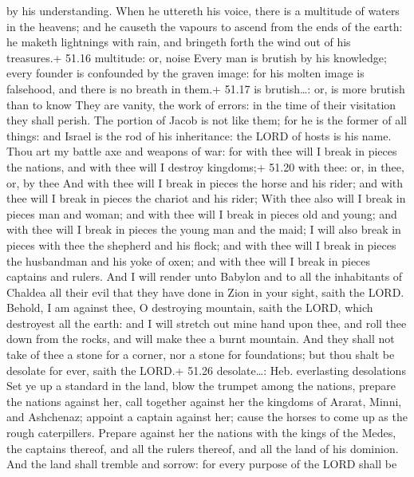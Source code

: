 by his understanding.  When he uttereth his voice, there is
a multitude of waters in the heavens; and he causeth the vapours to
ascend from the ends of the earth: he maketh lightnings with rain, and
bringeth forth the wind out of his treasures.+ 51.16 multitude: or,
noise  Every man is brutish by his knowledge; every founder
is confounded by the graven image: for his molten image is falsehood,
and there is no breath in them.+ 51.17 is brutish\ldots: or, is more
brutish than to know  They are vanity, the work of errors:
in the time of their visitation they shall perish.  The
portion of Jacob is not like them; for he is the former of all things:
and Israel is the rod of his inheritance: the LORD of hosts is his name.
 Thou art my battle axe and weapons of war: for with thee
will I break in pieces the nations, and with thee will I destroy
kingdoms;+ 51.20 with thee: or, in thee, or, by thee  And
with thee will I break in pieces the horse and his rider; and with thee
will I break in pieces the chariot and his rider;  With
thee also will I break in pieces man and woman; and with thee will I
break in pieces old and young; and with thee will I break in pieces the
young man and the maid;  I will also break in pieces with
thee the shepherd and his flock; and with thee will I break in pieces
the husbandman and his yoke of oxen; and with thee will I break in
pieces captains and rulers.  And I will render unto Babylon
and to all the inhabitants of Chaldea all their evil that they have done
in Zion in your sight, saith the LORD.  Behold, I am
against thee, O destroying mountain, saith the LORD, which destroyest
all the earth: and I will stretch out mine hand upon thee, and roll thee
down from the rocks, and will make thee a burnt mountain. 
And they shall not take of thee a stone for a corner, nor a stone for
foundations; but thou shalt be desolate for ever, saith the LORD.+ 51.26
desolate\ldots: Heb. everlasting desolations  Set ye up a
standard in the land, blow the trumpet among the nations, prepare the
nations against her, call together against her the kingdoms of Ararat,
Minni, and Ashchenaz; appoint a captain against her; cause the horses to
come up as the rough caterpillers.  Prepare against her the
nations with the kings of the Medes, the captains thereof, and all the
rulers thereof, and all the land of his dominion.  And the
land shall tremble and sorrow: for every purpose of the LORD shall be
